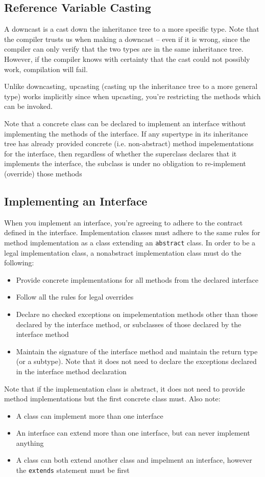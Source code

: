 \subsection{Reference Variable Casting}
A downcast is a cast down the inheritance tree to a more specific type. Note 
that the compiler trusts us when making a downcast -- even if it is wrong, 
since the compiler can only verify that the two types are in the same 
inheritance tree. However, if the compiler knows with certainty that the cast 
could not possibly work, compilation will fail.

Unlike downcasting, upcasting (casting up the inheritance tree to a more 
general type) works implicitly since when upcasting, you're restricting the 
methods which can be invoked.

Note that a concrete class can be declared to implement an interface without 
implementing the methods of the interface. If any supertype in its inheritance 
tree has already provided concrete (i.e. non-abstract) method impelementations 
for the interface, then regardless of whether the superclass declares that it
implements the interface, the subclass is under no obligation to re-implement 
(override) those methods

\subsection{Implementing an Interface}
When you implement an interface, you're agreeing to adhere to the contract 
defined in the interface. Implementation classes must adhere to the same rules 
for method implementation as a class extending an \verb#abstract# class. In
order to be a legal implementation class, a nonabstract implementation class 
must do the following:
\begin{itemize}
    \item Provide concrete implementations for all methods from the declared 
    interface
    \item Follow all the rules for legal overrides
    \item Declare no checked exceptions on impelementation methods other than 
    those declared by the interface method, or subclasses of those declared by 
    the interface method
    \item Maintain the signature of the interface method and maintain the 
    return type (or a subtype). Note that it does not need to declare the 
    exceptions declared in the interface method declaration
\end{itemize}
Note that if the implementation class is abstract, it does not need to provide 
method implementations but the first concrete class must. Also note:
\begin{itemize}
    \item A class can implement more than one interface
    \item An interface can extend more than one interface, but can never 
    implement anything
    \item A class can both extend another class and impelment an interface, 
    however the \verb#extends# statement must be first
\end{itemize}

